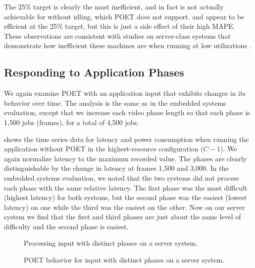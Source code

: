 The 25\% target is clearly the most inefficient, and in fact is not actually achievable for  without idling, which POET does not support.
 and  appear to be efficient at the 25\% target, but this is just a side effect of their high MAPE.
These observations are consistent with studies on server-class systems that demonstrate how inefficient these machines are when running at low utilizations \cite{google,pupil}.


\subsection{Responding to Application Phases}

We again examine POET with an application input that exhibits changes in its behavior over time.
The analysis is the same as in the embedded systems evaluation, except that we increase each video phase length so that each phase is 1,500 jobs (frames), for a total of 4,500 jobs.

 shows the time series data for latency and power consumption when running the application without POET in the highest-resource configuration ($C-1$).
We again normalize latency to the maximum recorded value.
The phases are clearly distinguishable by the change in latency at frames 1,500 and 3,000.
In the embedded systems evaluation, we noted that the two systems did not process each phase with the same relative latency.
The first phase was the most difficult (highest latency) for both systems, but the second phase was the easiest (lowest latency) on one while the third was the easiest on the other.
Now on our server system we find that the first and third phases are just about the same level of difficulty and the second phase is easiest.

\begin{figure}[t]
  \centering
  
  \caption{Processing  input with distinct phases on a server system.}
  \label{fig:poet-server-phases-default}
\end{figure}
\begin{figure}[t]
  \centering
      
  \caption{POET behavior for  input with distinct phases on a server system.}
  \label{fig:poet-server-phases-x264}
\end{figure}

